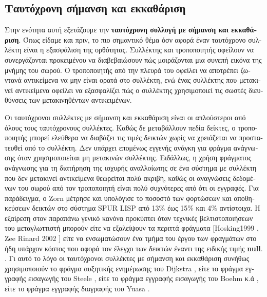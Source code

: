 \begin{greek}
\section{Ταυτόχρονη σήμανση και εκκαθάριση}
Στην ενότητα αυτή εξετάζουμε την
\textbf{ταυτόχρονη συλλογή με σήμανση και εκκαθάριση}. Όπως
είδαμε και πριν, το πιο σημαντικό θέμα όσν αφορά έναν
ταυτόχρονο συλλέκτη είναι η εξασφάλιση της ορθότητας.
Συλλέκτης και τροποποιητής οφείλουν να συνεργάζονται
προκειμένου να διαβεβαιώσουν πώς μοιράζονται μια συνεπή
εικόνα της μνήμης του σωρού. Ο τροποποιητής από την πλευρά
του οφείλει να αποτρέπει ζωντανά αντικείμενα να μην είναι
ορατά στο συλλέκτη, ενώ ένας συλλέκτης που μετακινεί
αντικείμενα οφείλει να εξασφαλίζει πώς ο συλλέκτης
χρησιμοποιεί τις σωστές διευθύνσεις των μετακινηθέντων
αντικειμένων.

Οι ταυτόχρονοι συλλέκτες με σήμανση και εκκαθάριση είναι οι
απλούστεροι από όλους τους ταυτόχρονους συλλέκτες. Καθώς δε
μεταβάλλουν πεδία δείκτες, ο τροποποιητής μπορεί ελεύθερα
να διαβάζει τις τιμές δεικτών χωρίς να χρειάζεται να
προστατευθεί από το συλλέκτη. Δεν υπάρχει επομένως εγγενής
ανάγκη για φράγμα ανάγνωσης όταν χρησιμοποιείται μη μετακινών
συλλέκτης. Ειδάλλως, η χρήση φράγματος ανάγνωσης για τη
διατήρηση της ισχυρής αναλλοίωτης σε ένα σύστημα με συλλέκτη
που δεν μετακινεί αντικείμενα θεωρείται πολύ ακριβή, καθώς οι
αναγνώσεις δεδομένων του σωρού από τον τροποποιητή είναι πολύ
συχνότερες από ότι οι εγγραφές. Για παράδειγμα, ο Zorn \cite{DBLP:conf/lfp/Zorn90}
μέτρησε και υπολόγισε το ποσοστό των φορτώσεων και αποθηκεύσεων
δεικτών στο σύστημα SPUR LISP από 13\% έως 15\% και 4\%
αντίστοιχα. Η εξαίρεση στον παραπάνω γενικό κανόνα προκύπτει
όταν τεχνικές βελτιστοποιήσεων του μεταγλωττιστή μπορούν
είτε να εξαλείψουν τα περιττά φράγματα [Hosking1999 \cite{DBLP:conf/oopsla/HoskingC99},
Zee Rinard 2002 \cite{DBLP:conf/oopsla/ZeeR02}]
είτε να ενσωματώσουν ένα τμήμα του έργου των φραγμάτων στο ήδη
υπάρχον κόστος που αφορά τον έλεγχο των δεικτών έναντι της ειδικής τιμής \textbf{null}. 
\cite{DBLP:conf/lctrts/BaconCR03}. Γι αυτό το λόγο οι
ταυτόχρονοι συλλέκτες με σήμανση και εκκαθάριση συνήθως 
χρησιμοποιούν το φράγμα αυξητικής ενημέρωσης του Dijkstra 
\cite{DBLP:conf/ac/DijkstraLMSS75,DBLP:journals/cacm/DijkstraLMSS78},
είτε το φράγμα εγγραφής εισαγωγής του Steele  \cite{DBLP:journals/cacm/Steele75},
είτε το φράγμα εγγραφής εισαγωγής του Boehm κ.ά \cite{DBLP:conf/pldi/BoehmDS91},
είτε το φράγμα εγγραφής διαγραφής του Yuasa \cite{DBLP:journals/jss/Yuasa90}.


\end{greek}
